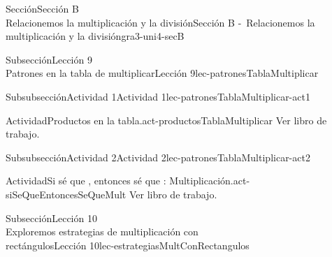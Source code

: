 \begin{sectionptx}{Sección}{{\Large Sección B\\}Relacionemos la multiplicación y la división}{}{Sección B -~Relacionemos la multiplicación y la división}{}{}{gra3-uni4-secB}
\begin{subsectionptx}{Subsección}{{\normalsize Lección 9\\[-0.05cm]}Patrones en la tabla de multiplicar}{}{Lección 9}{}{}{lec-patronesTablaMultiplicar}
\begin{subsubsectionptx}{Subsubsección}{Actividad 1}{}{Actividad 1}{}{}{lec-patronesTablaMultiplicar-act1}
\begin{activity}{Actividad}{Productos en la tabla.}{act-productosTablaMultiplicar}
Ver libro de trabajo.
\end{activity}%
\end{subsubsectionptx}
%
%
\typeout{************************************************}
\typeout{************************************************}
%
\begin{subsubsectionptx}{Subsubsección}{Actividad 2}{}{Actividad 2}{}{}{lec-patronesTablaMultiplicar-act2}
\begin{activity}{Actividad}{Si sé que \textellipsis{}, entonces sé que \textellipsis{}: Multiplicación.}{act-siSeQueEntoncesSeQueMult}%
Ver libro de trabajo.
\end{activity}%
\end{subsubsectionptx}
\end{subsectionptx}
%
%
\typeout{************************************************}
\typeout{************************************************}
%
\clearpage
\begin{subsectionptx}{Subsección}{{\normalsize Lección 10\\[-0.05cm]}Exploremos estrategias de multiplicación con\\rectángulos}{}{Lección 10}{}{}{lec-estrategiasMultConRectangulos}

\end{subsectionptx}
\end{sectionptx}

